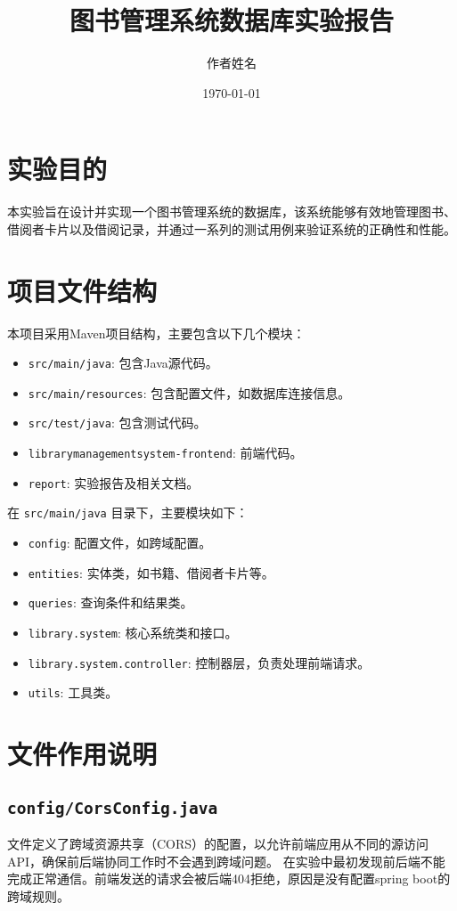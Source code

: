 \documentclass{ctexart}
\title{图书管理系统数据库实验报告}
\author{作者姓名}
\date{\today}
\begin{document}
\maketitle

\section{实验目的}
本实验旨在设计并实现一个图书管理系统的数据库，该系统能够有效地管理图书、借阅者卡片以及借阅记录，并通过一系列的测试用例来验证系统的正确性和性能。

\section{项目文件结构}

本项目采用Maven项目结构，主要包含以下几个模块：

\begin{itemize}
    \item \texttt{src/main/java}: 包含Java源代码。
    \item \texttt{src/main/resources}: 包含配置文件，如数据库连接信息。
    \item \texttt{src/test/java}: 包含测试代码。
    \item \texttt{librarymanagementsystem-frontend}: 前端代码。
    \item \texttt{report}: 实验报告及相关文档。
\end{itemize}

在 \texttt{src/main/java} 目录下，主要模块如下：

\begin{itemize}
    \item \texttt{config}: 配置文件，如跨域配置。
    \item \texttt{entities}: 实体类，如书籍、借阅者卡片等。
    \item \texttt{queries}: 查询条件和结果类。
    \item \texttt{library.system}: 核心系统类和接口。
    \item \texttt{library.system.controller}: 控制器层，负责处理前端请求。
    \item \texttt{utils}: 工具类。
\end{itemize}

\section{文件作用说明}

\subsection{\texttt{config/CorsConfig.java}}
文件定义了跨域资源共享（CORS）的配置，以允许前端应用从不同的源访问API，确保前后端协同工作时不会遇到跨域问题。
在实验中最初发现前后端不能完成正常通信。前端发送的请求会被后端404拒绝，原因是没有配置spring boot的跨域规则。
\end{document}
